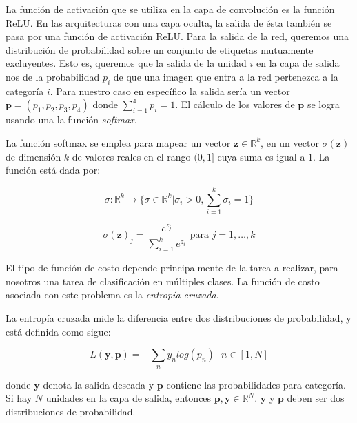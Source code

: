 La función de activación que se utiliza en la capa de
convolución es la función ReLU. En las arquitecturas con
una capa oculta, la salida de ésta también se pasa 
por una función de activación ReLU. Para la salida 
de la red, queremos una distribución de probabilidad
sobre un conjunto de etiquetas mutuamente excluyentes.
Esto es, queremos que la salida de la unidad $i$ en la capa
de salida nos de la probabilidad $p_i$ de que una imagen que
entra
a la red pertenezca a la categoría $i$. Para nuestro caso en específico
la salida sería un vector $\mathbf{p} = (p_1, p_2, p_3, p_4)$ donde $\sum_{i = 1}^4 p_i = 1$.
El cálculo de los valores de $\mathbf{p}$  se logra usando una la función \textit{softmax}.\\

\begin{remark}

La función softmax se emplea para mapear un vector $\mathbf{z} \in \mathbb{R}^k$,  en un vector $\sigma(\mathbf{z})$ de dimensión $k$ de valores reales en el rango $(0, 1]$ cuya suma es igual a $1$. La función está dada por: 
\end{remark}

\[
\sigma : \mathbb{R}^k \rightarrow \bigg \{ \sigma \in \mathbb{R}^k | \sigma_i > 0, \sum_{i=1}^k \sigma_i = 1 \bigg \}
\]

\[
\sigma(\mathbf{z})_j = \frac{e^{z_j}}{\sum_{i=1}^k e^{z_i}} \text{ para  } j=1,\dots,k
\]
%

El tipo de función de costo depende principalmente de la tarea a realizar,
para nosotros una tarea de clasificación en múltiples clases. La función
de costo asociada con este problema es la \textit{entropía cruzada}.\\

\begin{remark}
La entropía cruzada mide la diferencia entre dos distribuciones de probabilidad, y está
definida como sigue:

\[
L(\mathbf{y}, \mathbf{p}) = - \sum_{n} y_n log(p_n) \text{		} n \in [1,N]
\]

donde $\mathbf{y}$ denota la salida deseada y $\mathbf{p}$ contiene las probabilidades
para categoría. Si hay $N$ unidades en la capa de salida, entonces
$\mathbf{p}, \mathbf{y} \in \mathbb{R}^N$. $\mathbf{y}$ y $\mathbf{p}$ deben ser dos distribuciones de probabilidad.
\end{remark}


